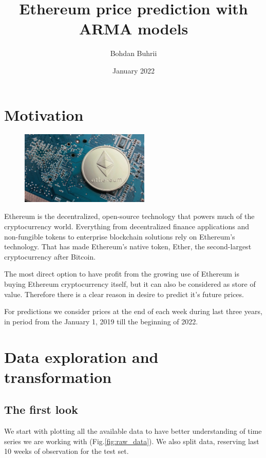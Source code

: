 \documentclass[14pt,a4paper]{extarticle}
\title{Ethereum price prediction with ARMA models}
\author{Bohdan Buhrii}
\date{January 2022}
\newcounter{e}
\newcounter{tabl}
\numberwithin{equation}{section}
\numberwithin{figure}{section}
\begin{document}
\maketitle

\newpage
\thispagestyle{empty}
\tableofcontents

\newpage
\thispagestyle{empty}
\section{Motivation}
\begin{figure}[h]
	\hspace{-0.5cm}
	\centering
	\includegraphics[width=0.55\textwidth]{resources/ethereum-crypto.jpg}
\end{figure}
Ethereum is the decentralized, open-source technology that powers much of the cryptocurrency world. Everything from decentralized finance applications and non-fungible tokens to enterprise blockchain solutions rely on Ethereum's technology. That has made Ethereum's native token, Ether, the second-largest cryptocurrency after Bitcoin.

The most direct option to have profit from the growing use of Ethereum is buying Ethereum cryptocurrency itself, but it can also be considered as store of value. Therefore there is a clear reason in desire to predict it's future prices.

For predictions we consider prices at the end of each week during last three years, in period from the January 1, 2019 till the beginning of 2022.

\section{Data exploration and transformation}%
\subsection{The first look}
We start with plotting all the available data to have better understanding of time series we are working with (Fig.\ref{fig:raw_data}). We also split data, reserving last 10 weeks of observation for the test set.
\end{document}
